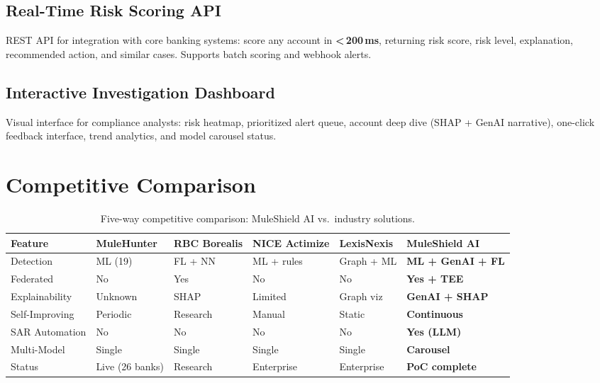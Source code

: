\documentclass[11pt, a4paper]{article}
\begin{document}

\subsection{Real-Time Risk Scoring API}

REST API for integration with core banking systems: score any account in \textbf{{<}\,200\,ms}, returning risk score, risk level, explanation, recommended action, and similar cases. Supports batch scoring and webhook alerts.

\subsection{Interactive Investigation Dashboard}

Visual interface for compliance analysts: risk heatmap, prioritized alert queue, account deep dive (SHAP + GenAI narrative), one-click feedback interface, trend analytics, and model carousel status.


\section{Competitive Comparison}

\begin{table}[H]
\centering
\footnotesize
{}
\begin{tabularx}{\textwidth}{L{2.5cm} L{2.3cm} L{2.3cm} L{2.3cm} L{2.3cm} X}
\toprule
{}
\textbf{Feature} & \textbf{MuleHunter} & \textbf{RBC Borealis} & \textbf{NICE Actimize} & \textbf{LexisNexis} & \textbf{MuleShield AI} \\
\midrule
Detection & ML (19) & FL + NN & ML + rules & Graph + ML & \textbf{ML + GenAI + FL} \\
Federated & \textcolor{warningred}{No} & \textcolor{highlightgreen}{Yes} & \textcolor{warningred}{No} & \textcolor{warningred}{No} & \textcolor{highlightgreen}{\textbf{Yes + TEE}} \\
Explainability & Unknown & SHAP & Limited & Graph viz & \textbf{GenAI + SHAP} \\
Self-Improving & Periodic & Research & Manual & Static & \textcolor{highlightgreen}{\textbf{Continuous}} \\
SAR Automation & \textcolor{warningred}{No} & \textcolor{warningred}{No} & \textcolor{warningred}{No} & \textcolor{warningred}{No} & \textcolor{highlightgreen}{\textbf{Yes (LLM)}} \\
Multi-Model & Single & Single & Single & Single & \textcolor{highlightgreen}{\textbf{Carousel}} \\
Status & Live (26 banks) & Research & Enterprise & Enterprise & \textbf{PoC complete} \\
\bottomrule
\end{tabularx}
\caption{Five-way competitive comparison: MuleShield AI vs.\ industry solutions.}
\end{table}
\end{document}
